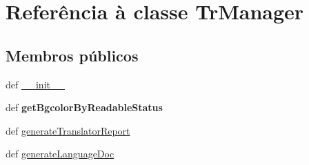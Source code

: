 \hypertarget{classtranslator_1_1_tr_manager}{\section{Referência à classe Tr\-Manager}
\label{classtranslator_1_1_tr_manager}
}
\subsection*{Membros públicos}
\begin{DoxyCompactItemize}
\item 
def \hyperlink{classtranslator_1_1_tr_manager_ac775ee34451fdfa742b318538164070e}{\-\_\-\-\_\-init\-\_\-\-\_\-}
\item 
\hypertarget{classtranslator_1_1_tr_manager_a08777fa5b59aefc04a1671bf437ac18d}{def {\bfseries get\-Bgcolor\-By\-Readable\-Status}}\label{classtranslator_1_1_tr_manager_a08777fa5b59aefc04a1671bf437ac18d}

\item 
def \hyperlink{classtranslator_1_1_tr_manager_abfed436ebf4b18a67134a430e64cbba0}{generate\-Translator\-Report}
\item 
def \hyperlink{classtranslator_1_1_tr_manager_ada68759a75596045b9d2e4b666acb862}{generate\-Language\-Doc}
\end{DoxyCompactItemize}
